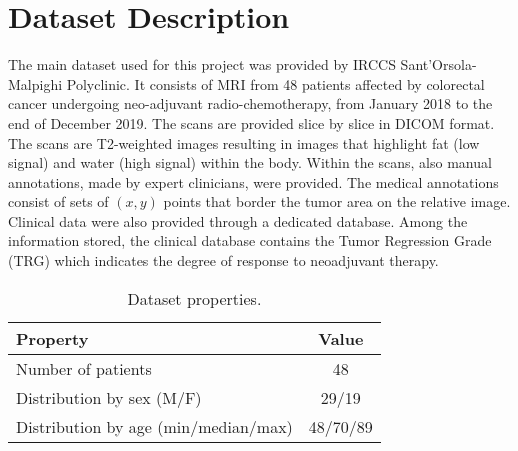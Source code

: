 \documentclass{standalone}
\begin{document}
\section{Dataset Description}
The main dataset used for this project was provided by IRCCS Sant’Orsola-Malpighi Polyclinic.
It consists of MRI from 48 patients affected by colorectal cancer undergoing neo-adjuvant radio-chemotherapy, from January 2018 to the end of December 2019.
The scans are provided slice by slice in DICOM format.
The scans are T2-weighted images resulting in images that highlight fat (low signal) and water (high signal) within the body.
Within the scans, also manual annotations, made by expert clinicians, were provided.
The medical annotations consist of sets of $(x, y)$ points that border the tumor area on the relative image.
Clinical data were also provided through a dedicated database.
Among the information stored, the clinical database contains the Tumor Regression Grade (TRG) which indicates the degree of response to neoadjuvant therapy.

\begin{table}[ht]
	\centering
	\begin{tabular}{lc}
		\toprule
		\textbf{Property} & \textbf{Value}   \\
	    \midrule
		Number of patients &  48 \\
	    \midrule
		Distribution by sex (M/F) &  29/19 \\
		\midrule
		Distribution by age (min/median/max) &   48/70/89  \\
		\bottomrule
	\end{tabular}
	\caption{Dataset properties.}
	\label{tab:properties}
\end{table}
\end{document}
